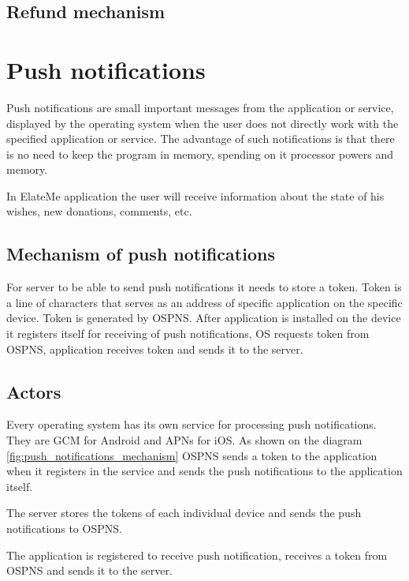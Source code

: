 \subsection{Refund mechanism}
%
%



\section{Push notifications}
Push notifications are small important messages from the application or service, displayed by the operating system when
the user does not directly work with the specified application or service. The advantage of such notifications is that
there is no need to keep the program in memory, spending on it processor powers and memory.

In ElateMe application the user will receive information about the state of his wishes, new donations, comments, etc.

\subsection{Mechanism of push notifications}


For server to be able to send push notifications it needs to store a token. Token is a line of characters that serves
as an address of specific application on the specific device. Token is generated by \ac{OSPNS}. After application is
installed on the device it registers itself for receiving of push notifications, OS requests token from \ac{OSPNS},
application receives token and sends it to the server.

\subsection{Actors}

\begin{itemize}
Every operating system has its own service for processing push notifications. They are \ac{GCM} for Android and \ac{APNs}
for iOS. As shown on the diagram \ref{fig:push_notifications_mechanism} OSPNS sends a token to the application
when it registers in the service and sends the push notifications to the application itself.

The server stores the tokens of each individual device and sends the push notifications to OSPNS.

The application is registered to receive push notification, receives a token from OSPNS and sends it to the server.
\end{itemize}







